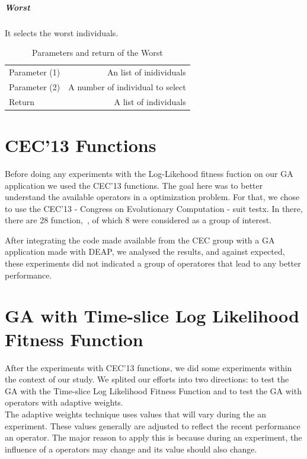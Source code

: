 \subparagraph{Worst}
It selects the worst individuals. \\

\begin{table}[!h]
  \begin{center}
  \begin{tabular}{|l|r|}
    \hline
    Parameter (1) & An list of inidividuals\\
    Parameter (2) & A number of individual to select\\
    Return &  A list of individuals\\
    \hline    
  \end{tabular}
  \end{center}
  \caption{Parameters and return of the Worst}
  \label{Worst}
\end{table}

\clearpage

\section{CEC'13 Functions}
Before doing any experiments with the Log-Likehood fitness fuction on our GA application we used the CEC'13 functions. The goal here was to better understand the available operators in a optimization problem. For that, we chose to use the CEC'13 - Congress on Evolutionary Computation - suit testx. In there, there are 28 function,~\cite{liang2013problem}, of which 8 were considered as a group of interest. 

After integrating the code made available from the CEC group with a GA application made with DEAP, we analysed the results, and against expected, these experiments did not indicated a group of operatores that lead to any better performance.\\

\section{GA with Time-slice Log Likelihood Fitness Function}
After the experiments with CEC'13 functions, we did some experiments within the context of our study. We splited our efforts into two directions: to test the GA with the Time-slice Log Likelihood Fitness Function and to test the GA with operators with adaptive weights.\\

The adaptive weights technique uses values that will vary during the an experiment. These values generally are adjusted to reflect the recent performance an operator. The major reason to apply this is because during an experiment, the influence of a operators may change and its value should also change.\\


